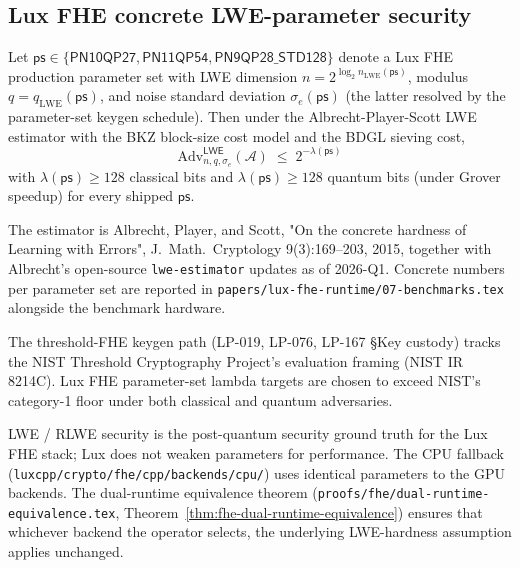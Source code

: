 
\subsection*{Lux FHE concrete LWE-parameter security}

\begin{theorem}
\label{thm:lwe-parameter-security}
Let $\mathsf{ps} \in \{\mathsf{PN10QP27}, \mathsf{PN11QP54},
\mathsf{PN9QP28\_STD128}\}$ denote a Lux FHE production parameter set with
LWE dimension $n = 2^{\log_2 n_{\mathrm{LWE}}(\mathsf{ps})}$, modulus
$q = q_{\mathrm{LWE}}(\mathsf{ps})$, and noise standard deviation
$\sigma_e(\mathsf{ps})$ (the latter resolved by the parameter-set keygen
schedule). Then under the Albrecht-Player-Scott LWE estimator with the
BKZ block-size cost model and the BDGL sieving cost,
\[
  \mathrm{Adv}^{\mathsf{LWE}}_{n, q, \sigma_e}(\mathcal{A})
  \;\leq\;
  2^{-\lambda(\mathsf{ps})}
\]
with $\lambda(\mathsf{ps}) \geq 128$ classical bits and $\lambda(\mathsf{ps})
\geq 128$ quantum bits (under Grover speedup) for every shipped
$\mathsf{ps}$.
\end{theorem}

\begin{remark}
\label{rem:albrecht-cite}
The estimator is Albrecht, Player, and Scott, "On the concrete hardness
of Learning with Errors", J.\ Math.\ Cryptology 9(3):169--203, 2015,
together with Albrecht's open-source \texttt{lwe-estimator} updates as of
2026-Q1. Concrete numbers per parameter set are reported in
\texttt{papers/lux-fhe-runtime/07-benchmarks.tex} alongside the
benchmark hardware.
\end{remark}

\begin{remark}
\label{rem:nist-8214c-alignment}
The threshold-FHE keygen path (LP-019, LP-076, LP-167 \S Key custody)
tracks the NIST Threshold Cryptography Project's evaluation framing
(NIST IR 8214C). Lux FHE parameter-set lambda targets are chosen to
exceed NIST's category-1 floor under both classical and quantum
adversaries.
\end{remark}

\begin{remark}[No PQ rollback]
\label{rem:no-pq-rollback}
LWE / RLWE security is the post-quantum security ground truth for the
Lux FHE stack; Lux does not weaken parameters for performance. The CPU
fallback (\texttt{luxcpp/crypto/fhe/cpp/backends/cpu/}) uses identical
parameters to the GPU backends. The dual-runtime equivalence theorem
(\texttt{proofs/fhe/dual-runtime-equivalence.tex},
Theorem~\ref{thm:fhe-dual-runtime-equivalence}) ensures that whichever
backend the operator selects, the underlying LWE-hardness assumption
applies unchanged.
\end{remark}
